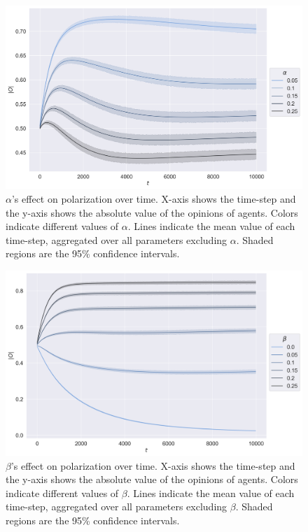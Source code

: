 \documentclass{article}
\begin{document}
\begin{figure}[H]
    \centering
    \includegraphics[width=.8\linewidth]{../plots/overall/Absolute_Opinion_Positive_Learning_Rate.png}
  \caption{$\alpha$'s effect on polarization over time. X-axis shows the time-step and the y-axis shows the absolute value of the opinions of agents. Colors indicate different values of $\alpha$. Lines indicate the mean value of each time-step, aggregated over all parameters excluding $\alpha$. Shaded regions are the 95\% confidence intervals.}
  \label{fig:sfig1}
\end{figure}

\begin{figure}[H]
    \centering
    \includegraphics[width=.8\linewidth]{../plots/overall/Absolute_Opinion_Negative_Learning_Rate.png}
  \caption{$\beta$'s effect on polarization over time. X-axis shows the time-step and the y-axis shows the absolute value of the opinions of agents. Colors indicate different values of $\beta$. Lines indicate the mean value of each time-step, aggregated over all parameters excluding $\beta$. Shaded regions are the 95\% confidence intervals.}
  \label{fig:sfig1}
\end{figure}
\end{document}
